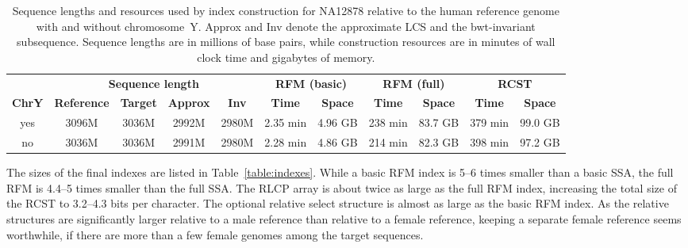 \documentclass[a4paper,11pt]{llncs}
\newcommand{\RCST}{\textsf{RCST}}
\newcommand{\SSA}{\textsf{SSA}}
\newcommand{\RFM}{\textsf{RFM}}
\newcommand{\RLCP}{\textsf{RLCP}}
\newcommand{\LCS}{\textsf{LCS}}
\begin{document}
\begin{table}
\caption{Sequence lengths and resources used by index construction for NA12878 relative to the human reference genome with and without chromosome~Y. Approx and Inv denote the approximate \LCS{} and the bwt-invariant subsequence. Sequence lengths are in millions of base pairs, while construction resources are in minutes of wall clock time and gigabytes of memory.}\label{table:construction}
\setlength{\extrarowheight}{2pt}
\setlength{\tabcolsep}{3pt}
\begin{center}
\begin{tabular}{c|cccc|cc|cc|cc}
\hline
 &
\multicolumn{4}{c|}{\textbf{Sequence length}} &
\multicolumn{2}{c|}{\textbf{\RFM{} (basic)}} &
\multicolumn{2}{c|}{\textbf{\RFM{} (full)}} &
\multicolumn{2}{c}{\textbf{\RCST}} \\
\textbf{ChrY} &
\textbf{Reference} & \textbf{Target} & \textbf{Approx} & \textbf{Inv} &
\textbf{Time} & \textbf{Space} &
\textbf{Time} & \textbf{Space} &
\textbf{Time} & \textbf{Space} \\
\hline
yes & 3096M & 3036M & 2992M & 2980M & 2.35 min & 4.96 GB & 238 min & 83.7 GB & 379 min & 99.0 GB \\
no  & 3036M & 3036M & 2991M & 2980M & 2.28 min & 4.86 GB & 214 min & 82.3 GB & 398 min & 97.2 GB \\
\hline
\end{tabular}
\end{center}
\end{table}

The sizes of the final indexes are listed in Table~\ref{table:indexes}. While a basic \RFM{} index is 5\nobreakdash--6 times smaller than a basic \SSA, the full \RFM{} is 4.4\nobreakdash--5 times smaller than the full \SSA. The \RLCP{} array is about twice as large as the full \RFM{} index, increasing the total size of the \RCST{} to 3.2\nobreakdash--4.3 bits per character. The optional relative select structure is almost as large as the basic \RFM{} index. As the relative structures are significantly larger relative to a male reference than relative to a female reference, keeping a separate female reference seems worthwhile, if there are more than a few female genomes among the target sequences.
\end{document}
